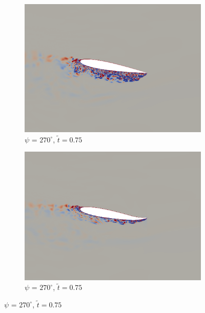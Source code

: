 \begin{figure}[H]\ContinuedFloat
	\centering
	
	\begin{subfigure}[b]{0.4\textwidth}
		\centering
		\includegraphics[width=1\textwidth]{figures/mu_2pt0/vorticity/baseline/phase_270.png}
		\caption{ $\psi$ = $270^\circ$, $\tilde{t}=0.75$}
		\label{fig:mu_2pt0_baseline_psi270}
	\end{subfigure}
	\begin{subfigure}[b]{0.4\textwidth}
		\centering
		\includegraphics[width=1\textwidth]{figures/mu_2pt0/vorticity/AC/phase_270.png}
		\caption{ $\psi$ = $270^\circ$, $\tilde{t}=0.75$}
		\label{fig:mu_2pt0_AC_psi270}
	\end{subfigure}
	

\end{figure}
